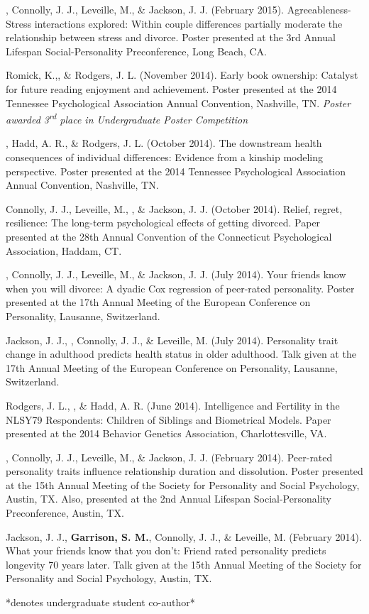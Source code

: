 \item\meb, Connolly, J. J., Leveille, M., \& Jackson, J. J. (February 2015). Agreeableness-Stress interactions explored: Within couple differences partially moderate the relationship between stress and divorce. Poster presented at the 3rd Annual Lifespan Social-Personality Preconference, Long Beach, CA.
\item Romick, K.,\student \meb, \& Rodgers, J. L. (November 2014). Early book ownership: Catalyst for future reading enjoyment and achievement. Poster presented at the 2014 Tennessee Psychological Association Annual Convention, Nashville, TN. \textit{Poster awarded 3\textsuperscript{rd} place in Undergraduate Poster Competition}
\item\meb, Hadd, A. R., \& Rodgers, J. L. (October 2014). The downstream health consequences of individual differences: Evidence from a kinship modeling perspective. Poster presented at the 2014 Tennessee Psychological Association Annual Convention, Nashville, TN.
\item Connolly, J. J., Leveille, M., \meb, \& Jackson, J. J. (October 2014). Relief,  regret,  resilience: The  long-term  psychological  effects  of  getting divorced. Paper presented at the 28th Annual Convention of the Connecticut Psychological Association, Haddam, CT.
\item\meb, Connolly, J. J., Leveille, M., \& Jackson, J. J. (July 2014). Your friends know when you will divorce: A dyadic Cox regression of peer-rated personality. Poster presented at the 17th Annual Meeting of the European Conference on Personality, Lausanne, Switzerland.
\item Jackson, J. J., \meb, Connolly, J. J., \& Leveille, M. (July 2014). Personality trait change in adulthood predicts health status in older adulthood. Talk given at the 17th Annual Meeting of the European Conference on Personality, Lausanne, Switzerland.
\item Rodgers, J. L., \meb, \& Hadd, A. R. (June 2014). Intelligence and Fertility in the NLSY79 Respondents: Children of Siblings and Biometrical Models. Paper presented at the 2014 Behavior Genetics Association, Charlottesville, VA. 
\item\meb, Connolly, J. J., Leveille, M., \& Jackson, J. J. (February 2014). Peer-rated personality traits influence relationship duration and dissolution. Poster presented at the 15th Annual Meeting of the Society for Personality and Social Psychology, Austin, TX. Also, presented at the 2nd Annual Lifespan Social-Personality  Preconference, Austin, TX.
\item Jackson, J. J., \textbf{Garrison, S. M.}, Connolly, J. J., \& Leveille, M. (February 2014). What your friends know that you don't: Friend rated personality predicts longevity 70 years later. Talk given at the 15th Annual Meeting of the Society for Personality and  Social Psychology, Austin, TX.
\vspace{-2mm}\begin{center}\footnotesize{*denotes undergraduate student co-author*}\end{center} \vspace{-3mm}